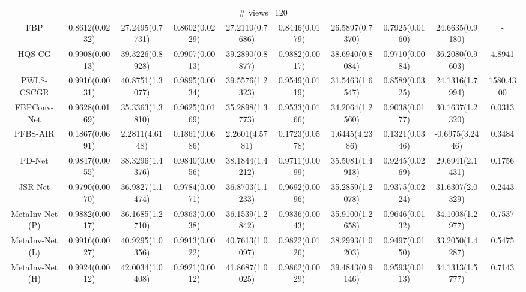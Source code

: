 \documentclass[journal,twoside]{IEEEtran}
\begin{document}
\begin{table*}[ht]
\begin{tabular}{|c|c|c|c|c|c|c|c|c|c|}
 \multicolumn{10}{|c|}{\cellcolor{gbygreen}\# views=120} \\
  \cline{1-10}
FBP
&0.8612(0.0232) &27.2495(0.7731) 
&0.8602(0.0229) &27.2110(0.7686) 
&0.8446(0.0179) &26.5897(0.7370) 
&0.7925(0.0160) &24.6635(0.9180) &-\\
  \cline{1-10}
 HQS-CG
&0.9908(0.0013) &39.3226(0.8928) 
&0.9907(0.0013) &39.2890(0.8877) 
&\cellcolor{gbypink}0.9882(0.0017) &\cellcolor{gbyblue}38.6940(0.8084) 
&\cellcolor{gbypink}0.9710(0.0084) &\cellcolor{gbypink}36.2080(0.9603) &4.8941\\
  \cline{1-10}
PWLS-CSCGR 
&\cellcolor{gbyblue}0.9916(0.0031) &40.8751(1.3077) 
&0.9895(0.0034) &39.5576(1.2323)
&0.9549(0.0119) &31.5463(1.6547)
&0.8589(0.0325) &24.1316(1.7994) &1580.4300\\
    \cline{1-10}
 FBPConv-Net 
&0.9628(0.0169) &35.3363(1.3810) 
&0.9625(0.0169) &35.2898(1.3773) 
&0.9533(0.0166) &34.2064(1.2560) 
&0.9038(0.0177) &30.1637(1.2320) &0.0313\\
    \cline{1-10}
 PFBS-AIR 
&0.1867(0.0691) &2.2811(4.6148) 
&0.1861(0.0686) &2.2601(4.5781) 
&0.1723(0.0578) &1.6445(4.2386) 
&0.1321(0.0346) &-0.6975(3.2446) &0.3484\\
    \cline{1-10}
 PD-Net
&0.9847(0.0055) &38.3296(1.4376) 
&0.9840(0.0056) &38.1844(1.4212) 
&0.9711(0.0099) &35.5081(1.4918) 
&0.9245(0.0269) &29.6941(2.1431) &0.1756\\
  \cline{1-10}
  JSR-Net
&0.9790(0.0070) &36.9827(1.1474) 
&0.9784(0.0071) &36.8703(1.1233) 
&0.9692(0.0096) &35.2859(1.2078) 
&0.9375(0.0224) &31.6307(2.0329) &0.2443\\
  \cline{1-10}
  MetaInv-Net (P)
&0.9882(0.0017) &36.1685(1.2710)
&0.9863(0.0038) &36.1539(1.2842) 
&0.9836(0.0043) &35.9100(1.2658)
&\cellcolor{gbyblue}0.9646(0.0132) &34.1008(1.2977) &0.7537\\
  \cline{1-10}
MetaInv-Net (L)
&\cellcolor{gbyblue}0.9916(0.0027) &\cellcolor{gbyblue}40.9295(1.0356) 
&\cellcolor{gbyblue}0.9913(0.0022) &\cellcolor{gbyblue}40.7613(1.0097) 
&0.9822(0.0126) &38.2993(1.0203) 
&0.9497(0.0150) &33.2050(1.4287) &0.5475\\
   \cline{1-10}
MetaInv-Net (H)
&\cellcolor{gbypink}0.9924(0.0012) &\cellcolor{gbypink}42.0034(1.0408) 
&\cellcolor{gbypink}0.9921(0.0012) &\cellcolor{gbypink}41.8687(1.0025) 
&\cellcolor{gbyblue}0.9862(0.0029) &\cellcolor{gbypink}39.4843(0.9146) 
&0.9593(0.0113) &\cellcolor{gbyblue}34.1313(1.5777) &0.7143\\
   \cline{1-10}
   

\end{tabular}
\end{table*}
\end{document}
